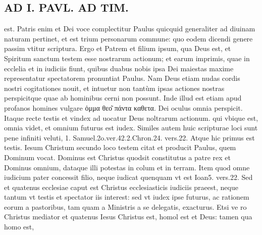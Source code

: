 \documentclass{article}
\begin{document}
\begin{pages}
\section*{AD I. PAVL. AD TIM. }
\marginpar{[ p.N ]}\pstart est. Patris enim et Dei voce complectitur Paulus quicquid generaliter ad diuinam naturam pertinet, et est trium personarum commune: quo eodem dicendi genere passim vtitur scriptura. Ergo et Patrem et filium ipsum, qua Deus est, et Spiritum sanctum testem esse nostrarum actionum; et earum imprimis, quae in ecclelia et in iudiciis fiunt, quibus duabus nobis ipsa Dei maiestas maxime representatur spectatorem pronuntiat Paulus. Nam Deus etiam nudas cordis nostri cogitationes nouit, et intuetur non tantùm ipsas actiones nostras perspicitque quae ab hominibus cerni non possunt. Inde illud est etiam apud profanos homines vulgare ὁμμα θεο͂ πάντα καθετα. Dei oculus omnia perspicit. Itaque recte testis et vindex ad uocatur Deus noltrarum actionum. qui vbique est, omnia videt, et omnium futurus est iudex. Similes autem huic scripturae loci sunt pene infiniti veluti, 1. Samuel.2o.ver.42.2.Chron.24. vers.22. Atque hic primus est testis.  \pend\pstart Iesum Christum secundo loco testem citat et producit Paulus, quem Dominum vocat. Dominus est Christus quodsit constitutus a patre rex et Dominus omnium, dataque illi potestas in colum et in terram. Item quod omne iudicium pater concessit filio, neque iudicat quenquam vt est Ioan5. vers.22. Sed et quatenus ecclesiae caput est Christus ecclesiasticis iudiciis praeest, neque tantum vt testis et spectator iis interest: sed vt iudex ipse futurus, ac rationem eorum a pastoribus, tam quam a Ministris a se delegatis, exacturus. Etsi ve ro Christus mediator et quatenus Iesus Christus est, homol est et Deus: tamen qua homo est,  \pend

\end{pages}
\end{document}
